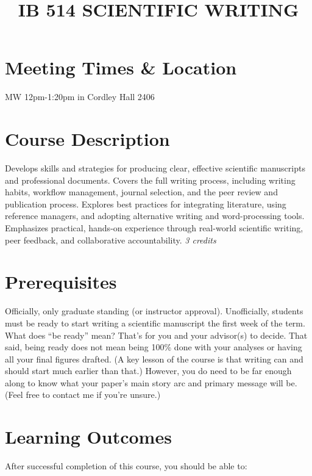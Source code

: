 \documentclass[10pt]{article}
\title{IB 514 SCIENTIFIC WRITING}
\author{}
\date{}
\begin{document}
\maketitle
\vspace{-50pt}


\section*{Meeting Times \& Location}
\noindent
MW 12pm-1:20pm in Cordley Hall 2406

\section*{Course Description}
\noindent
	Develops skills and strategies for producing clear, effective scientific manuscripts and 
	professional documents. Covers the full writing process, including writing habits, workflow 
	management, journal selection, and the peer review and publication process. Explores best 
	practices for integrating literature, using reference managers, and adopting alternative writing and 
	word-processing tools. Emphasizes practical, hands-on experience through real-world scientific 
	writing, peer feedback, and collaborative accountability.
		\textit{3 credits}

	
\section*{Prerequisites}
\noindent
	Officially, only graduate standing (or instructor approval).
	Unofficially, students must be ready to start writing a scientific manuscript the first week of the 
	term. What does “be ready” mean? That’s for you and your advisor(s) to decide. That said, being 
	ready does not mean being 100\% done with your analyses or having all your final figures drafted. 
	(A key lesson of the course is that writing can and should start much earlier than that.) However, 
	you do need to be far enough along to know what your paper’s main story arc and primary 
	message will be. (Feel free to contact me if you’re unsure.)

\section*{Learning Outcomes}
\noindent
After successful completion of this course, you should be able to:
\end{document}
